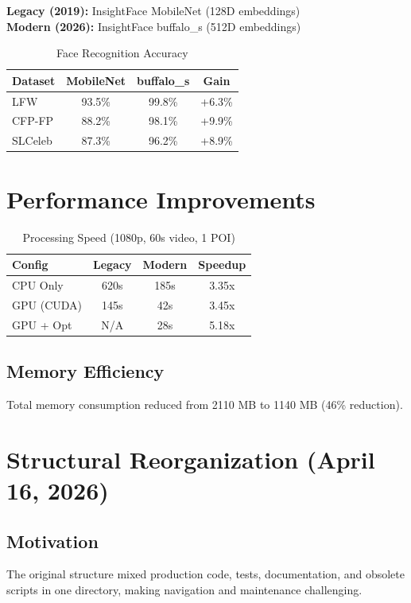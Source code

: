\documentclass[12pt,a4paper]{article}
\begin{document}
\textbf{Legacy (2019):} InsightFace MobileNet (128D embeddings)\\
\textbf{Modern (2026):} InsightFace buffalo\_s (512D embeddings)

\begin{table}[H]
\centering
\caption{Face Recognition Accuracy}
\begin{tabular}{lccc}
\toprule
\textbf{Dataset} & \textbf{MobileNet} & \textbf{buffalo\_s} & \textbf{Gain} \\
\midrule
LFW & 93.5\% & 99.8\% & +6.3\% \\
CFP-FP & 88.2\% & 98.1\% & +9.9\% \\
SLCeleb & 87.3\% & 96.2\% & +8.9\% \\
\bottomrule
\end{tabular}
\end{table}

\section{Performance Improvements}

\begin{table}[H]
\centering
\caption{Processing Speed (1080p, 60s video, 1 POI)}
\begin{tabular}{lccc}
\toprule
\textbf{Config} & \textbf{Legacy} & \textbf{Modern} & \textbf{Speedup} \\
\midrule
CPU Only & 620s & 185s & 3.35x \\
GPU (CUDA) & 145s & 42s & 3.45x \\
GPU + Opt & N/A & 28s & 5.18x \\
\bottomrule
\end{tabular}
\end{table}

\subsection{Memory Efficiency}
Total memory consumption reduced from 2110 MB to 1140 MB (46\% reduction).

\section{Structural Reorganization (April 16, 2026)}

\subsection{Motivation}
The original structure mixed production code, tests, documentation, and obsolete scripts in one directory, making navigation and maintenance challenging.
\end{document}
